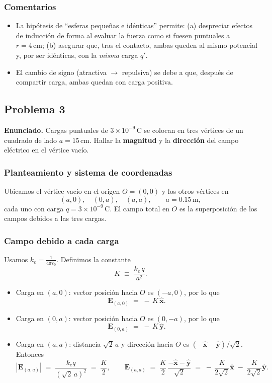 \documentclass{article}
\begin{document}
\subsubsection*{Comentarios}
\begin{itemize}
  \item La hipótesis de ``esferas pequeñas e idénticas'' permite: (a) despreciar efectos de inducción de forma al evaluar la fuerza como si fuesen puntuales a $r=4\,\mathrm{cm}$; (b) asegurar que, tras el contacto, ambas queden al mismo potencial y, por ser idénticas, con la \emph{misma} carga $q'$.
  \item El cambio de signo (atractiva $\to$ repulsiva) se debe a que, después de compartir carga, ambas quedan con carga positiva.
\end{itemize}



\subsection{Problema 3} \vspace{0.5cm}

\textbf{Enunciado.} Cargas puntuales de $3\times 10^{-9}\,\mathrm{C}$ se colocan en tres vértices de un cuadrado de lado $a=15\,\mathrm{cm}$. Hallar la \textbf{magnitud} y la \textbf{dirección} del campo eléctrico en el vértice vacío.

\subsubsection*{Planteamiento y sistema de coordenadas}
Ubicamos el vértice vacío en el origen $O=(0,0)$ y los otros vértices en
\[
(a,0),\quad (0,a),\quad (a,a),\qquad a=0.15\,\mathrm{m},
\]
cada uno con carga $q=3\times 10^{-9}\,\mathrm{C}$. El campo total en $O$ es la superposición de los campos debidos a las tres cargas.

\subsubsection*{Campo debido a cada carga}
Usamos $k_e=\frac{1}{4\pi\varepsilon_0}$. Definimos la constante
\[
K \;\equiv\; \frac{k_e\,q}{a^2}.
\]
\begin{itemize}
  \item Carga en $(a,0)$: vector posición hacia $O$ es $(-a,0)$, por lo que
  \[
  \mathbf E_{(a,0)} \;=\; -\,K\,\hat{\mathbf x}.
  \]
  \item Carga en $(0,a)$: vector posición hacia $O$ es $(0,-a)$, por lo que
  \[
  \mathbf E_{(0,a)} \;=\; -\,K\,\hat{\mathbf y}.
  \]
  \item Carga en $(a,a)$: distancia $\sqrt{2}\,a$ y dirección hacia $O$ es $(-\hat{\mathbf x}-\hat{\mathbf y})/\sqrt{2}$. Entonces
  \[
  \left\lvert \mathbf E_{(a,a)} \right\rvert \;=\; \frac{k_e q}{(\sqrt{2}\,a)^2} \;=\; \frac{K}{2},
  \qquad
  \mathbf E_{(a,a)} \;=\; \frac{K}{2}\,\frac{-\hat{\mathbf x}-\hat{\mathbf y}}{\sqrt{2}}
  \;=\; -\,\frac{K}{2\sqrt{2}}\hat{\mathbf x}\;-\;\frac{K}{2\sqrt{2}}\hat{\mathbf y}.
  \]
\end{itemize}
\end{document}
